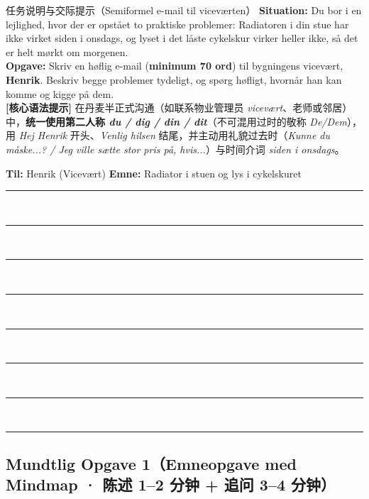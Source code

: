\begin{tipbox}{任务说明与交际提示（Semiformel e-mail til viceværten）}
\small
\textbf{Situation:} Du bor i en lejlighed, hvor der er opstået to praktiske problemer: Radiatoren i din stue har ikke virket siden i onsdags, og lyset i det låste cykelskur virker heller ikke, så det er helt mørkt om morgenen.\\
\textbf{Opgave:} Skriv en høflig e-mail (\textbf{minimum 70 ord}) til bygningens vicevært, \textbf{Henrik}. Beskriv begge problemer tydeligt, og spørg høfligt, hvornår han kan komme og kigge på dem.\\[3pt]
\textbf{\color{NCDRed}[核心语法提示]} 在丹麦半正式沟通（如联系物业管理员 \textit{vicevært}、老师或邻居）中，\textbf{统一使用第二人称 \textit{du / dig / din / dit}}（不可混用过时的敬称 \textit{De/Dem}），用 \textit{Hej Henrik} 开头、\textit{Venlig hilsen} 结尾，并主动用礼貌过去时（\textit{Kunne du måske...? / Jeg ville sætte stor pris på, hvis...}）与时间介词 \textit{siden i onsdags}。
\end{tipbox}

\begin{tcolorbox}[enhanced, colback=white, colframe=NCDGray, arc=2pt, boxrule=0.8pt, left=10pt, right=10pt, top=7pt, bottom=7pt]
\textbf{Til:} Henrik (Vicevært) \qquad\qquad \textbf{Emne:} Radiator i stuen og lys i cykelskuret\\[6pt]
\rule{\linewidth}{0.4pt}\\[10pt]
\rule{\linewidth}{0.4pt}\\[10pt]
\rule{\linewidth}{0.4pt}\\[10pt]
\rule{\linewidth}{0.4pt}\\[10pt]
\rule{\linewidth}{0.4pt}\\[10pt]
\rule{\linewidth}{0.4pt}\\[10pt]
\rule{\linewidth}{0.4pt}\\[10pt]
\rule{\linewidth}{0.4pt}
\end{tcolorbox}


\subsection*{Mundtlig Opgave 1（Emneopgave med Mindmap · 陈述 1--2 分钟 + 追问 3--4 分钟）}

